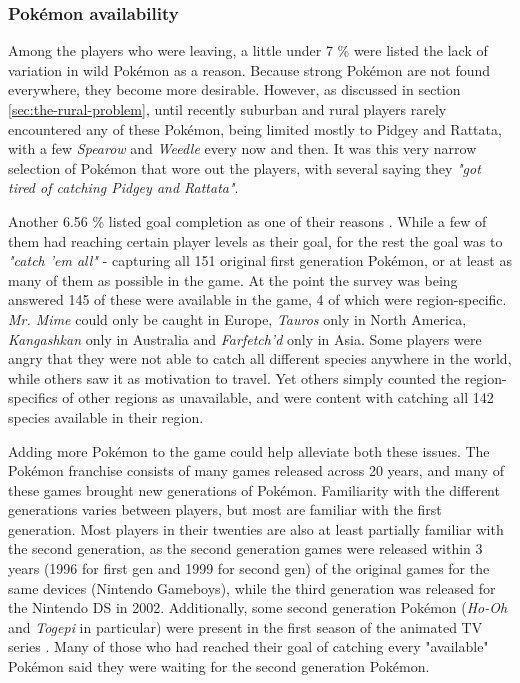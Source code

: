 \subsubsection{Pokémon availability}
\label{sec:pokemon-availability-and-goal-completion}
Among the players who were leaving, a little under 7 \% were listed the lack of variation in wild Pokémon as a reason. Because strong Pokémon are not found everywhere, they become more desirable. However, as discussed in section \ref{sec:the-rural-problem}, until recently suburban and rural players rarely encountered any of these Pokémon, being limited mostly to Pidgey and Rattata, with a few \emph{Spearow} and \emph{Weedle} every now and then. It was this very narrow selection of Pokémon that wore out the players, with several saying they \emph{"got tired of catching Pidgey and Rattata"}.

Another 6.56 \% listed goal completion as one of their reasons . While a few of them had reaching certain player levels as their goal, for the rest the goal was to \emph{"catch 'em all"} - capturing all 151 original first generation Pokémon, or at least as many of them as possible in the game. At the point the survey was being answered 145 of these were available in the game, 4 of which were region-specific. \emph{Mr. Mime} could only be caught in Europe, \emph{Tauros} only in North America, \emph{Kangashkan} only in Australia and \emph{Farfetch'd} only in Asia. Some players were angry that they were not able to catch all different species anywhere in the world, while others saw it as motivation to travel. Yet others simply counted the region-specifics of other regions as unavailable, and were content with catching all 142 species available in their region.

Adding more Pokémon to the game could help alleviate both these issues. The Pokémon franchise consists of many games released across 20 years, and many of these games brought new generations of Pokémon. Familiarity with the different generations varies between players, but most are familiar with the first generation. Most players in their twenties are also at least partially familiar with the second generation, as the second generation games were released within 3 years (1996 for first gen and 1999 for second gen) of the original games for the same devices (Nintendo Gameboys), while the third generation was released for the Nintendo DS in 2002. Additionally, some second generation Pokémon (\emph{Ho-Oh} and \emph{Togepi} in particular) were present in the first season of the animated TV series . Many of those who had reached their goal of catching every "available" Pokémon said they were waiting for the second generation Pokémon.

